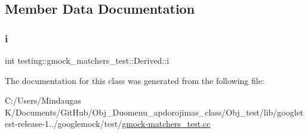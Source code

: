 \subsection{Member Data Documentation}
\mbox{\label{classtesting_1_1gmock__matchers__test_1_1_derived_a357d6747c44d7af7159fb5898a782f1b}} 
\subsubsection{\texorpdfstring{i}{i}}
{\footnotesize\ttfamily int testing\+::gmock\+\_\+matchers\+\_\+test\+::\+Derived\+::i}



The documentation for this class was generated from the following file\+:\begin{DoxyCompactItemize}
\item 
C\+:/\+Users/\+Mindaugas K/\+Documents/\+Git\+Hub/\+Obj\+\_\+\+Duomenu\+\_\+apdorojimas\+\_\+class/\+Obj\+\_\+test/lib/googletest-\/release-\/1../googlemock/test/\mbox{\hyperlink{_obj__test_2lib_2googletest-release-1_88_81_2googlemock_2test_2gmock-matchers__test_8cc}{gmock-\/matchers\+\_\+test.\+cc}}\end{DoxyCompactItemize}

